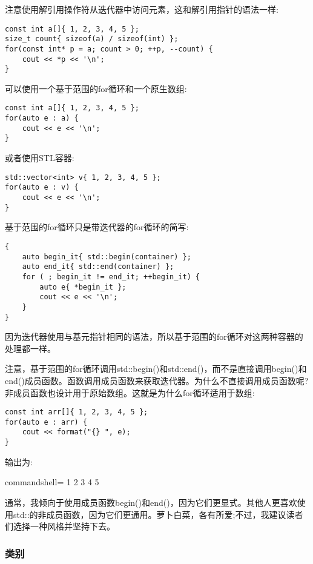 注意使用解引用操作符从迭代器中访问元素，这和解引用指针的语法一样:

\begin{lstlisting}[style=styleCXX]
const int a[]{ 1, 2, 3, 4, 5 };
size_t count{ sizeof(a) / sizeof(int) };
for(const int* p = a; count > 0; ++p, --count) {
	cout << *p << '\n';
}
\end{lstlisting}

可以使用一个基于范围的for循环和一个原生数组:

\begin{lstlisting}[style=styleCXX]
const int a[]{ 1, 2, 3, 4, 5 };
for(auto e : a) {
	cout << e << '\n';
}
\end{lstlisting}

或者使用STL容器:

\begin{lstlisting}[style=styleCXX]
std::vector<int> v{ 1, 2, 3, 4, 5 };
for(auto e : v) {
	cout << e << '\n';
}
\end{lstlisting}

基于范围的for循环只是带迭代器的for循环的简写:

\begin{lstlisting}[style=styleCXX]
{
	auto begin_it{ std::begin(container) };
	auto end_it{ std::end(container) };
	for ( ; begin_it != end_it; ++begin_it) {
		auto e{ *begin_it };
		cout << e << '\n';
	}
}
\end{lstlisting}

因为迭代器使用与基元指针相同的语法，所以基于范围的for循环对这两种容器的处理都一样。

注意，基于范围的for循环调用std::begin()和std::end()，而不是直接调用begin()和end()成员函数。函数调用成员函数来获取迭代器。为什么不直接调用成员函数呢?非成员函数也设计用于原始数组。这就是为什么for循环适用于数组:

\begin{lstlisting}[style=styleCXX]
const int arr[]{ 1, 2, 3, 4, 5 };
for(auto e : arr) {
	cout << format("{} ", e);
}
\end{lstlisting}

输出为:

\begin{tcblisting}{commandshell={}}
1 2 3 4 5
\end{tcblisting}

通常，我倾向于使用成员函数begin()和end()，因为它们更显式。其他人更喜欢使用std::的非成员函数，因为它们更通用。萝卜白菜，各有所爱;不过，我建议读者们选择一种风格并坚持下去。

\subsubsection{类别}

